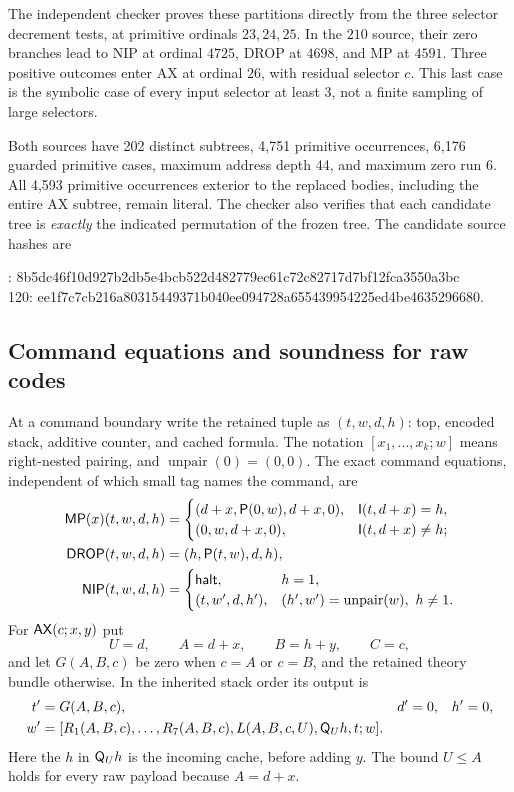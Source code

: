 The independent checker proves these partitions directly from the three
selector decrement tests, at primitive ordinals $23,24,25$. In the
$210$ source, their zero branches lead to NIP at ordinal $4725$, DROP
at $4698$, and MP at $4591$. Three positive outcomes enter AX at ordinal
$26$, with residual selector $c$. This last case is the symbolic case
of every input selector at least $3$, not a finite sampling of large
selectors.

Both sources have 202 distinct subtrees, 4,751 primitive occurrences,
6,176 guarded primitive cases, maximum address depth 44, and maximum
zero run 6. All 4,593 primitive occurrences exterior to the replaced
bodies, including the entire AX subtree, remain literal. The checker
also verifies that each candidate tree is \emph{exactly} the indicated
permutation of the frozen tree. The candidate source hashes are
\begin{center}\footnotesize{}: 8b5dc46f10d927b2db5e4bcb522d482779ec61c72c82717d7bf12fca3550a3bc\\
120: ee1f7c7cb216a80315449371b040ee094728a655439954225ed4be4635296680.
\end{center}

\subsection{Command equations and soundness for raw codes}

At a command boundary write the retained tuple as $(t,w,d,h)$: top,
encoded stack, additive counter, and cached formula. The notation
$[x_1,\ldots,x_k;w]$ means right-nested pairing, and
$\operatorname{unpair}(0)=(0,0)$. The exact command equations, independent
of which small tag names the command, are
\begin{align*}
 \mathsf{MP}(x)(t,w,d,h)&=
 \begin{cases}
 (d+x,\mathsf P(0,w),d+x,0),&\mathsf I(t,d+x)=h,\\
 (0,w,d+x,0),&\mathsf I(t,d+x)\ne h;
 \end{cases}\\
 \mathsf{DROP}(t,w,d,h)&=(h,\mathsf P(t,w),d,h),\\
 \mathsf{NIP}(t,w,d,h)&=
 \begin{cases}
 \mathsf{halt},&h=1,\\
 (t,w',d,h'),&(h',w')=\operatorname{unpair}(w),\ h\ne1.
 \end{cases}
\end{align*}
For $\mathsf{AX}(c;x,y)$ put
\[
 U=d,\qquad A=d+x,\qquad B=h+y,\qquad C=c,
\]
and let $G(A,B,c)$ be zero when $c=A$ or $c=B$, and the retained theory
bundle otherwise. In the inherited stack order its output is
\begin{align*}
 t'&=G(A,B,c),& d'&=0,&h'&=0,\\
 w'&=[R_1(A,B,c),\ldots,R_7(A,B,c),L(A,B,c,U),\mathsf Q_Uh,t;w].
\end{align*}
Here the $h$ in $\mathsf Q_Uh$ is the incoming cache, before adding $y$.
The bound $U\leq A$ holds for every raw payload because $A=d+x$.

